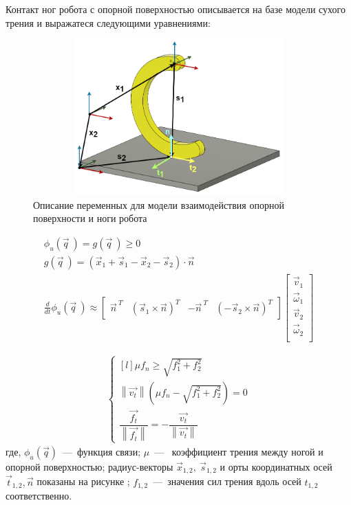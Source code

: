 Контакт ног робота с опорной поверхностью  описывается на базе модели сухого трения и выражатеся следующими уравнениями:

\begin{figure}[H]
    \centering\includegraphics[height=6cm,width=1\textwidth,keepaspectratio]{images/contact_interaction.png}
    \caption{Описание переменных для модели взаимодействия опорной поверхности и ноги робота}
    \label{fig:contact_interaction.png}
\end{figure}

\begin{eqnarray}
    \label{eq:contact_inter}
    \phi_u(\vec{q}\ ) = g(\vec{q}\ ) \geqslant 0 \\ 
    g(\vec{q}\ ) = (\vec{x}_1 + \vec{s}_1 - \vec{x}_2 - \vec{s}_2) \cdot \vec{n} \\
    \frac{d }{d t}\phi_u(\vec{q}\ ) \approx \begin{bmatrix}
        \vec{n}^{\ T} & (\vec{s}_1 \times \vec{n})^T & -\vec{n}^{\ T} & (-\vec{s}_2 \times \vec{n})^T
    \end{bmatrix} \begin{bmatrix}
        \vec{v}_1\\ 
    \vec{\omega}_1\\ 
    \vec{v}_2\\
    \vec{\omega}_2\\
    \end{bmatrix}
\end{eqnarray} 

\begin{eqnarray}
    \label{eq:ground_inter}
\left\{\begin{matrix*}[l]
\mu f_n \geqslant \sqrt{f_1^2 + f_2^2}\\ 
\left\lVert \vec{v_t}\right\rVert (\mu f_n - \sqrt{f_1^2 + f_2^2}) = 0\\
\dfrac{\vec{f_t}}{\left\lVert \vec{f_t}\right\rVert } = - \dfrac{\vec{v_t}}{\left\lVert \vec{v_t}\right\rVert }
\end{matrix*}\right.
\end{eqnarray}
где, $\phi_u(\vec{q})$~---~функция связи; $ \mu $~---~ коэффициент трения между ногой и опорной поверхностью;  радиус-векторы $\vec{x}_{1,2},\ \vec{s}_{1,2}$ и орты координатных осей $\vec{t}_{1,2}, \vec{n}$ показаны на рисунке ; $ f_{1,2} $~---~значения сил трения вдоль осей $t_{1,2}$ соответственно.


